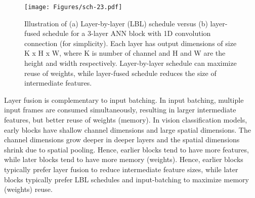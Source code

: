 

 

\begin{figure*}[!t]
\centering
\texttt{[image: Figures/sch-23.pdf]}
\caption{Illustration of (a) Layer-by-layer (LBL) schedule versus (b) layer-fused schedule for a 3-layer ANN block with 1D convolution connection (for simplicity). Each layer has output dimensions of size K x H x W, where K is number of channel and H and W are the height and width respectively. Layer-by-layer schedule can maximize reuse of weights, while layer-fused schedule reduces the size of intermediate features.} %
\label{fig:dnn-sch}
\end{figure*}

Layer fusion is complementary to input batching. In input batching, multiple input frames are consumed simultaneously, resulting in larger intermediate features, but better reuse of weights (memory). In vision classification models, early blocks have shallow channel dimensions and large spatial dimensions. The channel dimensions grow deeper in deeper layers and the spatial dimensions shrink due to spatial pooling. Hence, earlier blocks tend to have more features, while later blocks tend to have more memory (weights). Hence, earlier blocks typically prefer layer fusion to reduce intermediate feature sizes, while later blocks typically prefer LBL schedules and input-batching to maximize memory (weights) reuse.

